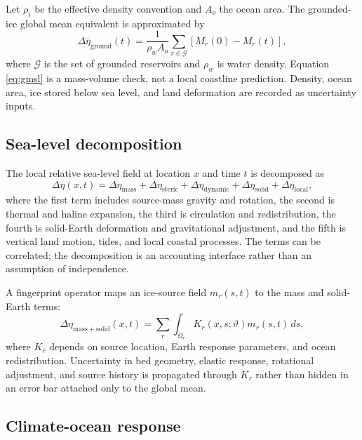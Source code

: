\documentclass[conference]{IEEEtran}
\begin{document}
Let $\rho_i$ be the effective density convention and $A_o$ the ocean area. The grounded-ice global mean equivalent is approximated by
\begin{equation}
 \Delta \overline{\eta}_{\mathrm{ground}}(t)=\frac{1}{\rho_w A_o}\sum_{r\in\mathcal{G}}\left[M_r(0)-M_r(t)\right],
 \label{eq:gmsl}
\end{equation}
where $\mathcal{G}$ is the set of grounded reservoirs and $\rho_w$ is water density. Equation \eqref{eq:gmsl} is a mass-volume check, not a local coastline prediction. Density, ocean area, ice stored below sea level, and land deformation are recorded as uncertainty inputs.

\subsection{Sea-level decomposition}

The local relative sea-level field at location $x$ and time $t$ is decomposed as
\begin{equation}
 \Delta\eta(x,t)=\Delta\eta_{\mathrm{mass}}+\Delta\eta_{\mathrm{steric}}+\Delta\eta_{\mathrm{dynamic}}+\Delta\eta_{\mathrm{solid}}+\Delta\eta_{\mathrm{local}},
 \label{eq:sealevel}
\end{equation}
where the first term includes source-mass gravity and rotation, the second is thermal and haline expansion, the third is circulation and redistribution, the fourth is solid-Earth deformation and gravitational adjustment, and the fifth is vertical land motion, tides, and local coastal processes. The terms can be correlated; the decomposition is an accounting interface rather than an assumption of independence.

A fingerprint operator maps an ice-source field $m_r(s,t)$ to the mass and solid-Earth terms:
\begin{equation}
 \Delta\eta_{\mathrm{mass+solid}}(x,t)=\sum_r\int_{\Omega_r}K_r(x,s;\vartheta)m_r(s,t)\,ds,
 \label{eq:fingerprint}
\end{equation}
where $K_r$ depends on source location, Earth response parameters, and ocean redistribution. Uncertainty in bed geometry, elastic response, rotational adjustment, and source history is propagated through $K_r$ rather than hidden in an error bar attached only to the global mean.

\subsection{Climate-ocean response}
\end{document}
